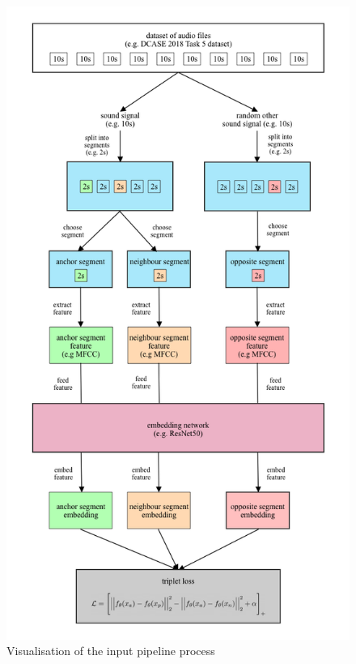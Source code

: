 \begin{figure}[htbp]
	\centering
	\includegraphics[scale=0.4]{baa-documentation/img/Input_Pipeline_Visualisation.png}
	\caption{Visualisation of the input pipeline process}
	\label{fig:Input-Pipeline-Visualisation}
\end{figure}

